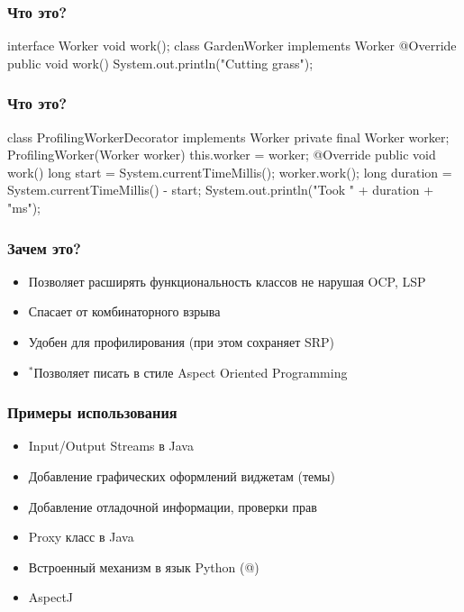 \documentclass[russian,aspectratio=169,14pt]{beamer}
\begin{document}
\begin{frame}[fragile]
	\frametitle{Что это?}
	\begin{listjava}
interface Worker {
    void work();
}
class GardenWorker implements Worker {
    @Override
    public void work() {
        System.out.println("Cutting grass");
    }
}
	\end{listjava}
\end{frame}

\begin{frame}[fragile]
	\frametitle{Что это?}
	\begin{listjava}
class ProfilingWorkerDecorator implements Worker {
    private final Worker worker;
    ProfilingWorker(Worker worker) {
        this.worker = worker;
    }
    @Override
    public void work() {
        long start = System.currentTimeMillis();
        worker.work();
        long duration = System.currentTimeMillis() - start;
        System.out.println("Took " + duration + "ms");
    }
}
	\end{listjava}
\end{frame}

\begin{frame}
	\frametitle{Зачем это?}
	\begin{itemize}
		\item Позволяет расширять функциональность классов не нарушая OCP, LSP
		\pause
		\item Спасает от комбинаторного взрыва
		\pause
		\item Удобен для профилирования (при этом сохраняет SRP)
		\pause
		\item $^*$Позволяет писать в стиле Aspect Oriented Programming
	\end{itemize}
\end{frame}

\begin{frame}
	\frametitle{Примеры использования}
	\begin{itemize}
		\item Input/Output Streams в Java
		\item Добавление графических оформлений виджетам (темы)
		\item Добавление отладочной информации, проверки прав
		\item Proxy класс в Java
		\item Встроенный механизм в язык Python (@)
		\item AspectJ
	\end{itemize}
\end{frame}
\end{document}
